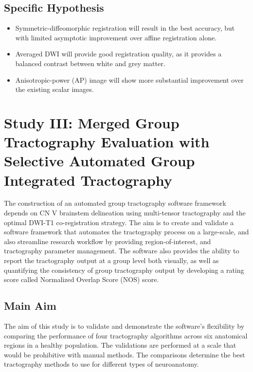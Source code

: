 \subsection{Specific Hypothesis}
\begin{itemize}
    \item Symmetric-diffeomorphic registration will result in the best accuracy, but with limited asymptotic improvement over affine registration alone.
    \item Averaged DWI will provide good registration quality, as it provides a balanced contrast between white and grey matter.
    \item Anisotropic-power (AP) image will show more substantial improvement over the existing scalar images.
\end{itemize}

\section{Study III: Merged Group Tractography Evaluation with Selective Automated Group Integrated Tractography}
The construction of an automated group tractography software framework depends on CN V brainstem delineation using multi-tensor tractography and the optimal DWI-T1 co-registration strategy. The aim is to create and validate a software framework that automates the tractography process on a large-scale, and also streamline research workflow by providing region-of-interest, and tractography parameter management. The software also provides the ability to report the tractography output at a group level both visually, as well as quantifying the consistency of group tractography output by developing a rating score called Normalized Overlap Score (NOS) score. 

\subsection{Main Aim}
The aim of this study is to validate and demonstrate the software's flexibility by comparing the performance of four tractography algorithms across six anatomical regions in a healthy population. The validations are performed  at a scale that would be prohibitive with manual methods. The comparisons determine the best tractography methods to use for different types of neuroanatomy.

